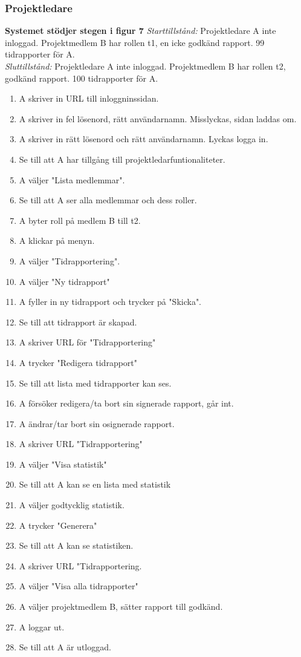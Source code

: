 \documentclass[a4paper]{article}
\begin{document}
\subsubsection{Projektledare}


\begin{ST}
\item 
\textbf{Systemet stödjer stegen i figur 7}
\emph{Starttillstånd:} Projektledare A inte inloggad. Projektmedlem B har rollen t1, en icke godkänd rapport. 99 tidrapporter för A.\\
\emph{Sluttillstånd:} Projektledare A inte inloggad. Projektmedlem B har rollen t2, godkänd rapport. 100 tidrapporter för A.\\

\begin{enumerate}

\item A skriver in URL till inloggninssidan.
\item A skriver in fel lösenord, rätt användarnamn. Misslyckas, sidan laddas om.
\item A skriver in rätt lösenord och rätt användarnamn. Lyckas logga in.
\item Se till att A har tillgång till projektledarfuntionaliteter.
\item A väljer "Lista medlemmar".
\item Se till att A ser alla medlemmar och dess roller.
\item A byter roll på medlem B till t2.
\item A klickar på menyn.
\item A väljer "Tidrapportering".
\item A väljer "Ny tidrapport"
\item A fyller in ny tidrapport och trycker på "Skicka".
\item Se till att tidrapport är skapad.
\item A skriver URL för "Tidrapportering"
\item A trycker "Redigera tidrapport"
\item Se till att lista med tidrapporter kan ses.
\item A försöker redigera/ta bort sin signerade rapport, går int.
\item A ändrar/tar bort sin osignerade rapport.
\item A skriver URL "Tidrapportering"
\item A väljer "Visa statistik"
\item Se till att A kan se en lista med statistik
\item A väljer godtycklig statistik.
\item A trycker "Generera"
\item Se till att A kan se statistiken.
\item A skriver URL "Tidrapportering.
\item A väljer "Visa alla tidrapporter"
\item A väljer projektmedlem B, sätter rapport till godkänd.
\item A loggar ut.
\item Se till att A är utloggad.




\end{enumerate}
\end{ST}
\end{document}
